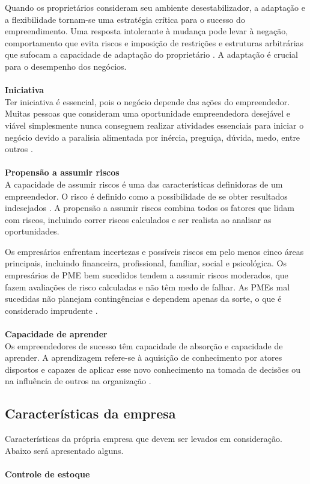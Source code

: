 Quando os proprietários consideram seu ambiente desestabilizador, a adaptação e a flexibilidade tornam-se uma estratégia crítica para o sucesso do empreendimento. Uma resposta intolerante à mudança pode levar à negação, comportamento que evita riscos e imposição de restrições e estruturas arbitrárias que sufocam a capacidade de adaptação do proprietário \cite{MorrisMichaelandZahra2000}. A adaptação é crucial para o desempenho dos negócios.
\\
\\
\textbf{Iniciativa}
\\

Ter iniciativa é essencial, pois o negócio depende das ações do empreendedor. Muitas pessoas que consideram uma oportunidade empreendedora desejável e viável simplesmente nunca conseguem realizar atividades essenciais para
iniciar o negócio devido a paralisia alimentada por inércia, preguiça, dúvida, medo, entre outros \cite{stephenl.muelleranisyas.thomas2001}.
\\
\\
\textbf{Propensão a assumir riscos}
\\

A capacidade de assumir riscos é uma das características definidoras de um empreendedor. O risco é definido como a possibilidade de se obter resultados indesejados \cite{MorrisMichaelandZahra2000}. A propensão a assumir riscos combina todos os fatores que lidam com riscos, incluindo correr riscos calculados e ser realista ao analisar as oportunidades.

Os empresários enfrentam incertezas e possíveis riscos em pelo menos cinco áreas principais, incluindo financeira, profissional, famíliar, social e psicológica. Os empresários de PME bem sucedidos tendem a assumir riscos moderados, que fazem avaliações de risco calculadas e não têm medo de falhar. As PMEs mal sucedidas não planejam contingências e dependem apenas da sorte, o que é considerado imprudente \cite{thandekaruthkunene2008}.
\\
\\
\textbf{Capacidade de aprender}
\\

Os empreendedores de sucesso têm capacidade de absorção e capacidade de aprender. A aprendizagem refere-se à aquisição de conhecimento por atores dispostos e capazes de aplicar esse novo conhecimento na tomada de decisões ou na influência de outros na organização \cite{MorrisMichaelandZahra2000}.

\subsection{Características da empresa}
\label{subsec:framing}
Características da própria empresa que devem ser levados em consideração. Abaixo será apresentado alguns.
\\
\\
\textbf{Controle de estoque}
\\


